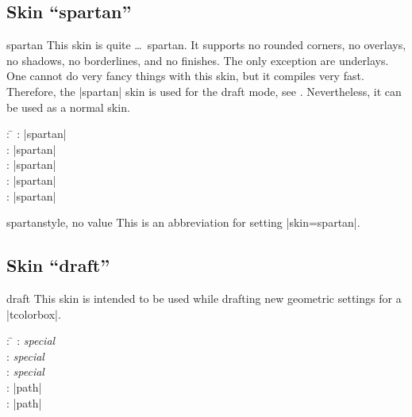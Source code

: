 \clearpage

\subsection{Skin \enquote{spartan}}\label{subsec:spartan}

\begin{docSkin}{spartan}
  This skin is quite \ldots\ spartan.
  It supports no rounded corners, no overlays, no shadows, no borderlines,
  and no finishes. The only exception are underlays.
  One cannot do very fancy things with this skin, but it compiles very fast.
  Therefore, the |spartan| skin is
  used for the draft mode, see .
  Nevertheless, it can be used as a normal skin.

\begin{tcolorbox}[skintable=spartan]
  \begin{tabbing}
    : \=\kill
    :           \> |spartan|\\
    : \> |spartan|\\ 
    :        \> |spartan|\\
    :    \> |spartan|\\
    :           \> |spartan|
  \end{tabbing}
\end{tcolorbox}
\end{docSkin}


\begin{docTcbKey}{spartan}{}{style, no value}
  This is an abbreviation for setting |skin=spartan|.
\end{docTcbKey}


\begin{dispExample}
\end{dispExample}


\clearpage

\subsection{Skin \enquote{draft}}\label{subsec:draft}

\begin{docSkin}{draft}
  This skin is intended to be used while drafting new geometric settings
  for a |tcolorbox|.
\begin{tcolorbox}[skintable=draft]
  \begin{tabbing}
    : \=\kill
    :           \> \emph{special}\\
    : \> \emph{special}\\ 
    :        \> \emph{special}\\
    :    \> |path|\\
    :           \> |path|
  \end{tabbing}
\end{tcolorbox}
\end{docSkin}

